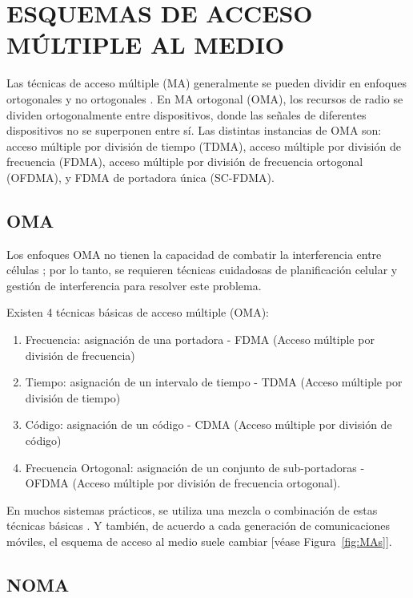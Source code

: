 \section{ESQUEMAS DE ACCESO MÚLTIPLE AL MEDIO}
Las técnicas de acceso múltiple (MA) generalmente se pueden dividir en enfoques ortogonales y no ortogonales \parencite{Tse2004}. En MA ortogonal (OMA), los recursos de radio se dividen ortogonalmente entre dispositivos, donde las señales de diferentes dispositivos no se superponen entre sí. Las distintas instancias de OMA son: acceso múltiple por división de tiempo (TDMA), acceso múltiple por división de frecuencia (FDMA), acceso múltiple por división de frecuencia ortogonal (OFDMA), y FDMA de portadora única (SC-FDMA).

\subsection{OMA}

Los enfoques OMA no tienen la capacidad de combatir la interferencia entre células \parencite{Shirvanimoghaddam2017}; por lo tanto, se requieren técnicas cuidadosas de planificación celular y gestión de interferencia para resolver este problema. \newline

Existen 4 técnicas básicas de acceso múltiple (OMA):

\begin{enumerate}
\item  Frecuencia: asignación de una portadora - FDMA (Acceso múltiple por división de frecuencia)
\item  Tiempo: asignación de un intervalo de tiempo - TDMA (Acceso múltiple por división de tiempo)
\item  Código: asignación de un código - CDMA (Acceso múltiple por división de código)
\item  Frecuencia Ortogonal: asignación de un conjunto de sub-portadoras - OFDMA (Acceso múltiple por división de frecuencia ortogonal).
\end{enumerate}

En muchos sistemas prácticos, se utiliza una mezcla o combinación de estas técnicas básicas \parencite{Correia2018}. Y también, de acuerdo a cada generación de comunicaciones móviles, el esquema de acceso al medio suele cambiar [véase Figura~\ref{fig:MAs}].

\subsection{NOMA}\label{NOMA_C2}

